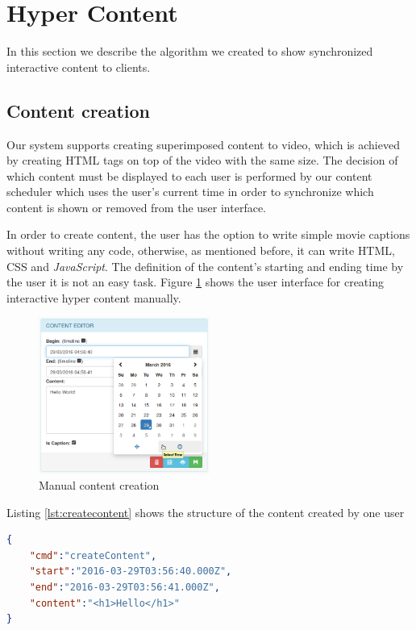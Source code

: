 \section{Hyper Content}
	In this section we describe the algorithm we created to show synchronized interactive content to clients.


	\subsection{Content creation}

	Our system supports creating superimposed content to video, which is achieved by creating \ac{HTML} tags on top of the video  with the same size. The decision of which content must be displayed to each user is performed by our content scheduler which uses the user's current time in order to synchronize which content is shown or removed from the user interface.

	In order to create content, the user has the option to write simple movie captions without writing any code, otherwise, as mentioned before, it can write \ac{HTML}, \ac{CSS} and \emph{JavaScript}. The definition of the content's starting and ending time by the user it is not an easy task. 
	Figure \ref{fig:creation} shows the user interface for creating interactive hyper content manually.

	\begin{figure}[H]
		\centering
		\includegraphics[width=0.5\textwidth]{figures/edition.png}
		\caption{Manual content creation}
		\label{fig:creation}
	\end{figure}

	Listing \ref{lst:createcontent} shows the structure of the content created by one user%

\begin{minipage}{\linewidth}
\begin{lstlisting}[caption={Example of content created by one user},label={lst:createcontent},language=json]
{
	"cmd":"createContent",
	"start":"2016-03-29T03:56:40.000Z",
	"end":"2016-03-29T03:56:41.000Z",
	"content":"<h1>Hello</h1>"
}
\end{lstlisting}
\end{minipage}


